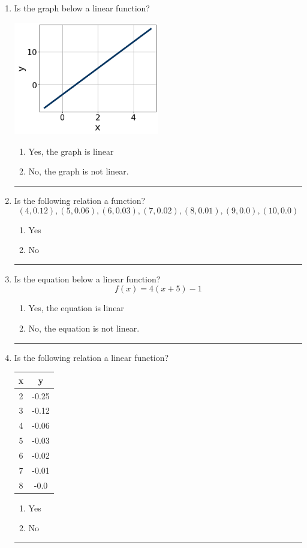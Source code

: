\documentclass[14pt]{extbook}
\newcommand{\litem}[1]{\item#1\hspace*{-1cm}\rule{\textwidth}{0.4pt}}
\begin{document}
\begin{enumerate}
\litem{
Is the graph below a linear function?
\begin{center}
    \includegraphics[width=0.5\textwidth]{../Figures/MA_8_F_1_2_graphY.png}
\end{center}
\begin{enumerate}[label=\Alph*.]
\item Yes, the graph is linear
\item No, the graph is not linear.

\end{enumerate} }
\litem{
Is the following relation a function?\[ (4, 0.12), (5, 0.06), (6, 0.03), (7, 0.02), (8, 0.01), (9, 0.0), (10, 0.0) \]\begin{enumerate}[label=\Alph*.]
\item Yes
\item No

\end{enumerate} }
\litem{
Is the equation below a linear function?\[ f(x) = 4(x + 5)-1 \]\begin{enumerate}[label=\Alph*.]
\item Yes, the equation is linear
\item No, the equation is not linear.

\end{enumerate} }
\litem{
Is the following relation a linear function?

\begin{tabular}{c|c}
x &y\tabularnewline \hline
2 &-0.25\tabularnewline \hline
3 &-0.12\tabularnewline \hline
4 &-0.06\tabularnewline \hline
5 &-0.03\tabularnewline \hline
6 &-0.02\tabularnewline \hline
7 &-0.01\tabularnewline \hline
8 &-0.0\end{tabular}\begin{enumerate}[label=\Alph*.]
\item Yes
\item No

\end{enumerate} }
\end{enumerate}
\end{document}
